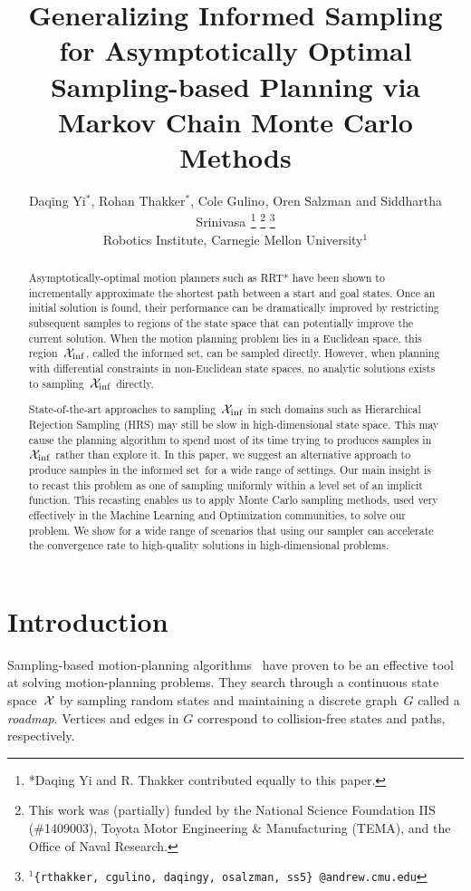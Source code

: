 \documentclass[letterpaper, 10 pt, conference]{ieeeconf}  %
\title{\LARGE \bf
Generalizing Informed Sampling
for Asymptotically Optimal Sampling-based Planning via Markov Chain
Monte Carlo Methods
}
\author{
Daqing Yi$^{*}$,
Rohan Thakker$^{*}$,
Cole Gulino$^{}$, 
Oren Salzman$^{}$ and
Siddhartha Srinivasa$^{}$%
\thanks{*Daqing Yi and R. Thakker contributed equally to this paper.}
\thanks{This work was (partially) funded by the National Science Foundation IIS (\#1409003), Toyota Motor Engineering \& Manufacturing (TEMA), and the Office of Naval Research.}%
\thanks{$^{1}${\tt\small \{rthakker, cgulino, daqingy, osalzman, ss5\} @andrew.cmu.edu}}%
%
\\        
Robotics Institute, Carnegie Mellon University$^{1}$
}
\begin{document}
\maketitle
\thispagestyle{empty}
\pagestyle{empty}


\begin{abstract}
Asymptotically-optimal motion planners such as RRT* have been shown to incrementally approximate the shortest path between a start and goal states.
Once an initial solution is found, their performance can be dramatically improved by restricting subsequent samples to regions of the state space that can potentially improve the current solution.
When the motion planning problem lies in a Euclidean space, this region~$\mathcal{X}_{\rm {inf}}$, called the informed set, can be sampled directly.
However, when planning with differential constraints in non-Euclidean state spaces, no analytic solutions exists to sampling~$\mathcal{X}_{\rm {inf}}$ directly.

State-of-the-art approaches to sampling~$\mathcal{X}_{\rm {inf}}$ in such domains such as Hierarchical Rejection Sampling (HRS) may still be slow in high-dimensional state space.
This may cause the planning algorithm to spend most of its time trying to produces samples in~$\mathcal{X}_{\rm {inf}}$ rather than explore it.
In this paper, we suggest an alternative approach to produce samples in the informed set~\Cinf for a wide range of settings.
Our main insight is to recast this problem as one of sampling uniformly within a level set of an implicit function.
This recasting enables us to apply Monte Carlo sampling methods, used very effectively in the Machine Learning and Optimization communities, to solve our problem.
We show for a wide range of scenarios that using our sampler can accelerate the convergence rate to high-quality solutions in high-dimensional problems.
\end{abstract}


\section{Introduction}
\label{sec:intro}


Sampling-based motion-planning algorithms~\cite{CBHKKLT05, L06} have proven to be an effective tool at solving motion-planning problems.
They search through a continuous state space~$\mathcal{X}$ by sampling random states and maintaining a discrete graph~$G$ called a \emph{roadmap}.
Vertices and edges in $G$ correspond to collision-free states and paths, respectively.
\end{document}
